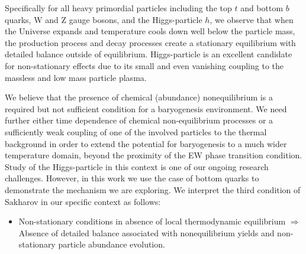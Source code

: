Specifically for all heavy primordial particles including the top $t$ and bottom $b$ quarks, W and Z gauge bosons, and the Higgs-particle $h$, we observe that when the Universe expands and temperature cools down well below the particle mass, the production process and decay processes create a stationary equilibrium with detailed balance outside of equilibrium. Higgs-particle is an excellent candidate for non-stationary effects due to its small and even vanishing coupling to the massless and low mass particle plasma. 

We believe that the presence of chemical (abundance) nonequilibrium
{\color{black}is a required but not sufficient condition for a baryogenesis environment. We need further either time dependence of chemical non-equilibrium processes or a sufficiently weak coupling of one of the involved particles to the thermal background in order to extend the potential for baryogenesis to a much wider temperature domain, beyond the proximity of the EW phase transition condition. Study of the Higgs-particle in this context is one of our ongoing research challenges. However, in this work
}
we use the case of bottom quarks to demonstrate the mechanism we are exploring. We interpret the third condition of Sakharov in our specific context as follows:
\begin{itemize}
\item Non-stationary conditions in absence of local thermodynamic equilibrium $\Longrightarrow$ Absence of detailed balance associated with nonequilibrium yields and non-stationary particle abundance evolution.
\end{itemize} 

